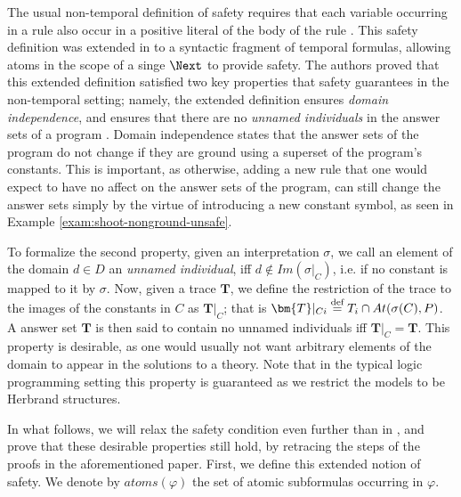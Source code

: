 The usual non-temporal definition of safety requires that each
variable occurring in a rule also occur in a positive literal of the
body of the rule \cite{gekakasc12a}. This safety definition was
extended in \cite{agcapevidi17a} to a syntactic fragment of temporal
formulas, allowing atoms in the scope of a singe $\Next$ to provide
safety. The authors proved that this extended definition satisfied two
key properties that safety guarantees in the non-temporal setting;
namely, the extended definition ensures \emph{domain independence},
and ensures that there are no \emph{unnamed individuals} in the answer
sets of a program \cite{capeva09a}\cite{capeva09b}. Domain
independence states that the answer sets of the program do not change
if they are ground using a superset of the program's constants. This
is important, as otherwise, adding a new rule that one would expect to
have no affect on the answer sets of the program, can still change the
answer sets simply by the virtue of introducing a new constant symbol,
as seen in Example \ref{exam:shoot-nonground-unsafe}.

To formalize the second property, given an interpretation $\sigma$, we
call an element of the domain $d \in D$ an \emph{unnamed individual},
iff $d \not\in Im(\sigma\vert_{C})$, i.e. if no constant is mapped to
it by $\sigma$. Now, given a trace $\bm{T}$, we define the restriction
of the trace to the images of the constants in $C$ as
$\bm{T}\vert _C$; that is
$\bm{T}\vert_{Ci} \defeq T_i \cap At(\sigma(C),P)$. A answer set
$\bm{T}$ is then said to contain no unnamed individuals iff
$\bm{T} \vert_{C} = \bm{T}$. This property is desirable, as one would
usually not want arbitrary elements of the domain to appear in the
solutions to a theory. Note that in the typical logic programming
setting this property is guaranteed as we restrict the models to be
Herbrand structures.

In what follows, we will relax the safety condition even further than
in \cite{agcapevidi17a}, and prove that these desirable properties
still hold, by retracing the steps of the proofs in the aforementioned
paper. First, we define this extended notion of safety. We denote by
$atoms(\varphi)$ the set of atomic subformulas occurring in $\varphi$.

